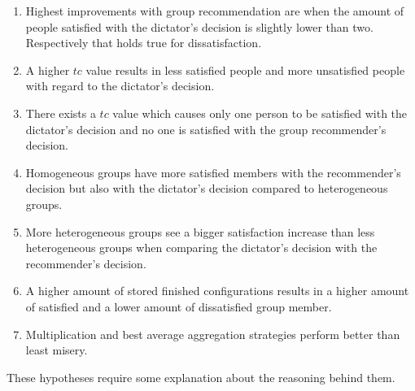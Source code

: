 \begin{enumerate}[font={\bfseries},label={H\arabic*}]
    \item \label{hyp:Evaluation:MaximumMinimum} Highest improvements with group recommendation are when the amount of people satisfied with the dictator's decision is slightly lower than two. Respectively that holds true for dissatisfaction. 
    \item \label{hyp:Evaluation:HigherTcLessSatisfied} A higher $tc$ value results in less satisfied people and more unsatisfied people with regard to the dictator's decision.
    \item \label{hyp:Evaluation:OnlyOneSatisfied} There exists a $tc$ value which causes only one person to be satisfied with the dictator's decision and no one is satisfied with the group recommender's decision.
    \item \label{hyp:Evaluation:HomogenousMoreSatisfied} Homogeneous groups have more satisfied members with the recommender's decision but also with the dictator's decision compared to heterogeneous groups.
    \item \label{hyp:Evaluation:HeterogenousBiggerSatisfactionIncrease} More heterogeneous groups see a bigger satisfaction increase than less heterogeneous groups when comparing the dictator's decision with the recommender's decision.
    \item \label{hyp:Evaluation:StoreSizeBetterResults} A higher amount of stored finished configurations results in a higher amount of satisfied and a lower amount of dissatisfied group member.
    \item \label{hyp:Evaluation:AggregationStrategies} Multiplication and best average aggregation strategies perform better than least misery. %
\end{enumerate}

These hypotheses require some explanation about the reasoning behind them.

